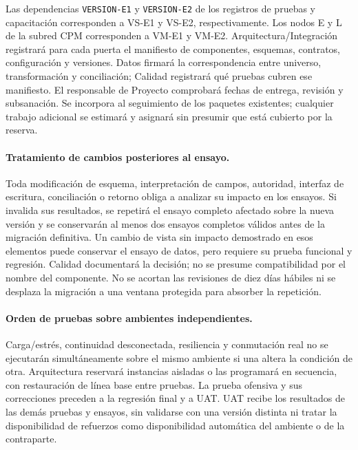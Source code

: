 
Las dependencias \texttt{VERSION-E1} y \texttt{VERSION-E2} de los registros de pruebas y capacitación corresponden a VS-E1 y VS-E2, respectivamente. Los nodos E y L de la subred CPM corresponden a VM-E1 y VM-E2. Arquitectura/Integración registrará para cada puerta el manifiesto de componentes, esquemas, contratos, configuración y versiones. Datos firmará la correspondencia entre universo, transformación y conciliación; Calidad registrará qué pruebas cubren ese manifiesto. El responsable de Proyecto comprobará fechas de entrega, revisión y subsanación. Se incorpora al seguimiento de los paquetes existentes; cualquier trabajo adicional se estimará y asignará sin presumir que está cubierto por la reserva.

\paragraph{Tratamiento de cambios posteriores al ensayo.}
Toda modificación de esquema, interpretación de campos, autoridad, interfaz de escritura, conciliación o retorno obliga a analizar su impacto en los ensayos. Si invalida sus resultados, se repetirá el ensayo completo afectado sobre la nueva versión y se conservarán al menos dos ensayos completos válidos antes de la migración definitiva. Un cambio de vista sin impacto demostrado en esos elementos puede conservar el ensayo de datos, pero requiere su prueba funcional y regresión. Calidad documentará la decisión; no se presume compatibilidad por el nombre del componente. No se acortan las revisiones de diez días hábiles ni se desplaza la migración a una ventana protegida para absorber la repetición.

\paragraph{Orden de pruebas sobre ambientes independientes.}
Carga/estrés, continuidad desconectada, resiliencia y conmutación real no se ejecutarán simultáneamente sobre el mismo ambiente si una altera la condición de otra. Arquitectura reservará instancias aisladas o las programará en secuencia, con restauración de línea base entre pruebas. La prueba ofensiva y sus correcciones preceden a la regresión final y a UAT. UAT recibe los resultados de las demás pruebas y ensayos, sin validarse con una versión distinta ni tratar la disponibilidad de refuerzos como disponibilidad automática del ambiente o de la contraparte.

